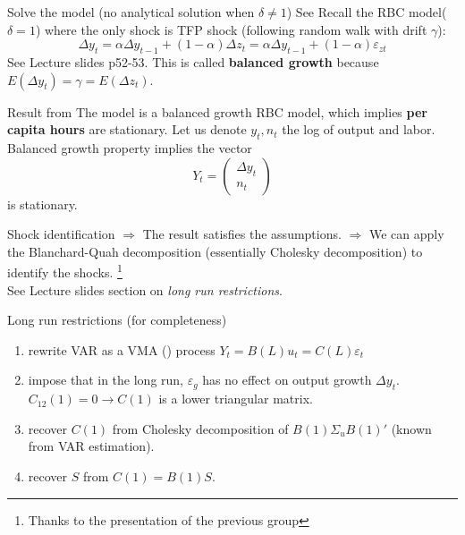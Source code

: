 \documentclass[10pt]{beamer}
\begin{document}
\begin{frame}{Solve the model (no analytical solution when $\delta \neq 1$)}
    See \cite{christiano_eichenbaum_2020}
    Recall the RBC model($\delta=1$) where the only shock is TFP shock (following random walk with drift $\gamma$):
    \begin{equation*}
        \Delta y_t = \alpha \Delta y_{t-1} + (1-\alpha) \Delta z_t = \alpha \Delta y_{t-1} + (1-\alpha) \varepsilon_{z t}
    \end{equation*}
    See Lecture slides p52-53. This is called \textbf{balanced growth} because $E(\Delta y_t) = \gamma = E(\Delta z_t)$.
    \begin{alertblock}{Result from \cite{christiano_eichenbaum_2020}}
        The model is a balanced growth RBC model, which implies \textbf{per capita hours} are stationary. Let us denote $y_t, n_t$ the log of output and labor. Balanced growth property implies the vector
        \begin{equation*}
            Y_t = \begin{pmatrix}
                \Delta y_t \\ n_t
            \end{pmatrix}
        \end{equation*} is stationary.
    \end{alertblock}
\end{frame}
\begin{frame}{Shock identification}
    $\Longrightarrow$ The result satisfies the \cite{blanchard_quah_1988} assumptions.
    $\Longrightarrow$ We can apply the Blanchard-Quah decomposition (essentially Cholesky decomposition) to identify the shocks. \footnote{Thanks to the presentation of the previous group }\\
    See Lecture slides section on \emph{long run restrictions}.
\end{frame}
\begin{frame}{Long run restrictions (for completeness)}
    \begin{enumerate}
        \item rewrite VAR as a VMA (\infty) process $Y_t=B(L)u_t=C(L)\varepsilon_t$
        \item impose that in the long run, $\varepsilon_g$ has no effect on output growth
              $\Delta y_t$. $C_{12}(1)=0\rightarrow C(1)$ is a lower triangular matrix.
        \item recover $C(1)$ from Cholesky decomposition of $B(1)\Sigma_u B(1)'$ (known from
              VAR estimation).
        \item recover $S$ from $C(1)=B(1)S$.
    \end{enumerate}
\end{frame}
\end{document}
